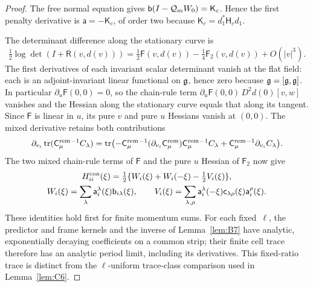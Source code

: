 \begin{proof}
The free normal equation gives $\mathsf{b}(I-\mathcal Q_mW_0)=\mathsf K_c$. Hence the first penalty derivative is $\mathsf a=-\mathsf K_c$, of order two because $\mathsf K_c=d_1^*\mathsf H_cd_1$.

The determinant difference along the stationary curve is
\begin{equation*}
\tfrac12\log\det(I+\mathsf R(v,d(v)))
=\tfrac12\mathsf F(v,d(v))-\tfrac14\mathsf F_2(v,d(v))+O(|v|^3).
\end{equation*}
The first derivatives of each invariant scalar determinant vanish at the flat field: each is an adjoint-invariant linear functional on $\mathfrak{g}$, hence zero because $\mathfrak{g}=[\mathfrak{g},\mathfrak{g}]$. In particular $\partial_u\mathsf F(0,0)=0$, so the chain-rule term $\partial_u\mathsf F(0,0)\,D^2d(0)[v,w]$ vanishes and the Hessian along the stationary curve equals that along its tangent. Since $\mathsf F$ is linear in $u$, its pure $v$ and pure $u$ Hessians vanish at $(0,0)$. The mixed derivative retains both contributions
\begin{equation*}
\partial_{v_i}\operatorname{tr}(\mathsf C^{\rm rem}_\mu{}^{-1}C_\lambda)
=\operatorname{tr}\bigl(-\mathsf C^{\rm rem}_\mu{}^{-1}(\partial_{v_i}\mathsf C^{\rm rem}_\mu)\mathsf C^{\rm rem}_\mu{}^{-1}C_\lambda
       +\mathsf C^{\rm rem}_\mu{}^{-1}\partial_{v_i}C_\lambda\bigr).
\end{equation*}
The two mixed chain-rule terms of $\mathsf F$ and the pure $u$ Hessian of $\mathsf F_2$ now give
\begin{gather*}
H^{\rm con}_{ii}(\xi)=\tfrac12\{W_i(\xi)+W_i(-\xi)-\tfrac12 V_i(\xi)\},\\
W_i(\xi)=\sum_\lambda\mathsf a_i^\lambda(\xi)\mathsf b_{i\lambda}(\xi),\qquad
V_i(\xi)=\sum_{\lambda,\rho}\mathsf a_i^\lambda(-\xi)
\mathsf c_{\lambda\rho}(\xi)\mathsf a_i^\rho(\xi).
\end{gather*}
These identities hold first for finite momentum sums. For each fixed~$\ell$, the predictor and frame kernels and the inverse of Lemma~\ref{lem:B7} have analytic, exponentially decaying coefficients on a common strip; their finite cell trace therefore has an analytic period limit, including its derivatives. This fixed-ratio trace is distinct from the $\ell$-uniform trace-class comparison used in Lemma~\ref{lem:C6}.


\end{proof}
